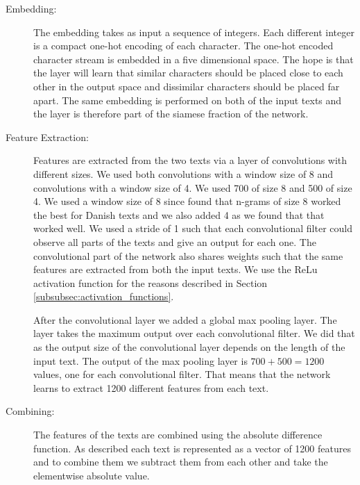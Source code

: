 \begin{description}

    \item[Embedding:]

        The embedding takes as input a sequence of integers. Each different
        integer is a compact one-hot encoding of each character. The one-hot
        encoded character stream is embedded in a five dimensional space. The
        hope is that the layer will learn that similar characters should be
        placed close to each other in the output space and dissimilar characters
        should be placed far apart. The same embedding is performed on both of
        the input texts and the layer is therefore part of the siamese fraction
        of the network.

    \item[Feature Extraction:]

        Features are extracted from the two texts via a layer of convolutions
        with different sizes. We used both convolutions with a window size of 8
        and convolutions with a window size of 4. We used 700 of size 8 and 500
        of size 4. We used a window size of 8 since \citet{aalykke2016} found
        that n-grams of size 8 worked the best for Danish texts and we also
        added 4 as we found that that worked well. We used a stride of 1 such
        that each convolutional filter could observe all parts of the texts and
        give an output for each one. The convolutional part of the network also
        shares weights such that the same features are extracted from both the
        input texts. We use the \gls{ReLu} activation function for the reasons
        described in Section \ref{subsubsec:activation_functions}.

        After the convolutional layer we added a global max pooling layer. The
        layer takes the maximum output over each convolutional filter. We did
        that as the output size of the convolutional layer depends on the length
        of the input text. The output of the max pooling layer is $700 + 500 =
        1200$ values, one for each convolutional filter. That means that the
        network learns to extract 1200 different features from each text.

    \item[Combining:]

        The features of the texts are combined using the absolute difference
        function. As described each text is represented as a vector of 1200
        features and to combine them we subtract them from each other and take
        the elementwise absolute value.


\end{description}
